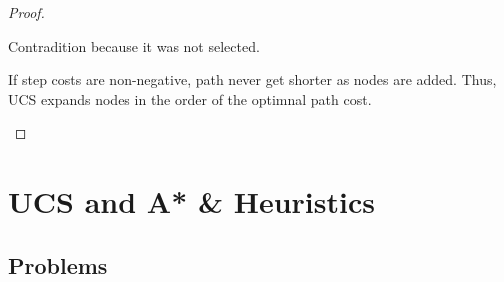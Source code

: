 \begin{listo}
\begin{solution}
\begin{proof}
\begin{listu}
                Contradition because it was not selected. 

                \item If step costs are non-negative, path never get shorter as nodes are added. Thus, UCS expands nodes in the order of the optimnal path cost. 
            \end{listu}
        \end{proof}
    \end{solution}
\end{listo}

\section{UCS and A* \& Heuristics}

\subsection{Problems}

